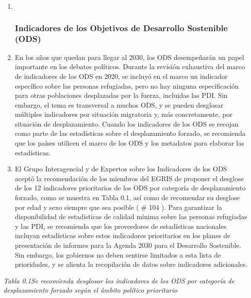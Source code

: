 \documentclass[
]{book}
\begin{document}
\begin{enumerate}
\def\labelenumi{\arabic{enumi}.}
\item ~
  \hypertarget{indicadores-de-los-objetivos-de-desarrollo-sostenible-ods}{%
  \subsubsection{Indicadores de los Objetivos de Desarrollo Sostenible (ODS)}\label{indicadores-de-los-objetivos-de-desarrollo-sostenible-ods}}
\item
  En los años que quedan para llegar al 2030, los ODS desempeñarán un papel importante en los debates políticos. Durante la revisión exhaustiva del marco de indicadores de los ODS en 2020, se incluyó en el marco un indicador específico sobre las personas refugiadas, pero no hay ninguna especificación para otras poblaciones desplazadas por la fuerza, incluidas las PDI. Sin embargo, el tema es transversal a muchos ODS, y se pueden desglosar múltiples indicadores por situación migratoria y, más concretamente, por situación de desplazamiento. Cuando los indicadores de los ODS se recojan como parte de las estadísticas sobre el desplazamiento forzado, se recomienda que los países utilicen el marco de los ODS y los metadatos para elaborar las estadísticas.
\item
  El Grupo Interagencial y de Expertos sobre los Indicadores de los ODS aceptó la recomendación de los miembros del EGRIS de proponer el desglose de los 12 indicadores prioritarios de los ODS por categoría de desplazamiento forzado, como se muestra en Tabla 0.1, así como de recomendar su desglose por edad y sexo siempre que sea posible (
  \# 104
  ). Para garantizar la disponibilidad de estadísticas de calidad mínima sobre las personas refugiadas y las PDI, se recomienda que los proveedores de estadísticas nacionales incluyan estadísticas sobre estos indicadores prioritarios en los planes de presentación de informes para la Agenda 2030 para el Desarrollo Sostenible. Sin embargo, los gobiernos no deben sentirse limitados a esta lista de prioridades, y se alienta la recopilación de datos sobre indicadores adicionales.
\end{enumerate}

\emph{Tabla 0.1Se recomienda desglosar los indicadores de los ODS por categoría de desplazamiento forzado según el ámbito político prioritario}
\end{document}
